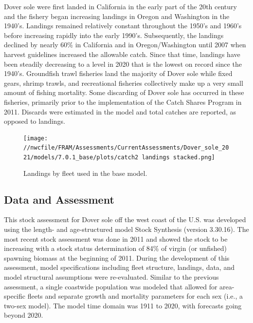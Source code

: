 \documentclass[11pt,
  english,
  a4paper,
]{article}
\begin{document}
Dover sole were first landed in California in the early part of the 20th century and the fishery began increasing landings in Oregon and Washington in the 1940's. Landings remained relatively constant throughout the 1950's and 1960's before increasing rapidly into the early 1990's. Subsequently, the landings declined by nearly 60\% in California and in Oregon/Washington until 2007 when harvest guidelines increased the allowable catch. Since that time, landings have been steadily decreasing to a level in 2020 that is the lowest on record since the 1940's. Groundfish trawl fisheries land the majority of Dover sole while fixed gears, shrimp trawls, and recreational fisheries collectively make up a very small amount of fishing mortality. Some discarding of Dover sole has occurred in these fisheries, primarily prior to the implementation of the Catch Shares Program in 2011. Discards were estimated in the model and total catches are reported, as opposed to landings.

\leavevmode\tagmcend\tagstructend\par


\begin{figure}
\centering
\texttt{[image: //nwcfile/FRAM/Assessments/CurrentAssessments/Dover\_sole\_2021/models/7.0.1\_base/plots/catch2 landings stacked.png]}
\caption{Landings by fleet used in the base model.\label{fig:es-catch}}
\end{figure}

\tagmcend\tagstructend




\hypertarget{data-and-assessment}{%
\subsection*{Data and Assessment}\label{data-and-assessment}}

\leavevmode\tagmcend\tagstructend


This stock assessment for Dover sole off the west coast of the U.S. was developed using the length- and age-structured model Stock Synthesis (version 3.30.16). The most recent stock assessment was done in 2011 and showed the stock to be increasing with a stock status determination of 84\% of virgin (or unfished) spawning biomass at the beginning of 2011. During the development of this assessment, model specifications including fleet structure, landings, data, and model structural assumptions were re-evaluated. Similar to the previous assessment, a single coastwide population was modeled that allowed for area-specific fleets and separate growth and mortality parameters for each sex (i.e., a two-sex model). The model time domain was 1911 to 2020, with forecasts going beyond 2020.
\end{document}
